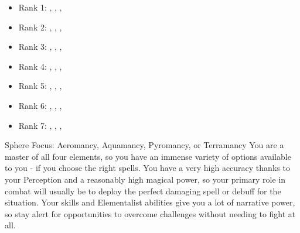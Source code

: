             \begin{itemize}
                \RaggedRight
                \item Rank 1: , , , 
                \item Rank 2: , , , 
                \item Rank 3: , , , 
                \item Rank 4: , , , 
                \item Rank 5: , , , 
                \item Rank 6: , , , 
                \item Rank 7: , , , 
            \end{itemize}
             Sphere Focus: Aeromancy, Aquamancy, Pyromancy, or Terramancy
             You are a master of all four elements, so you have an immense variety of options available to you - if you choose the right spells.
            You have a very high accuracy thanks to your Perception and a reasonably high magical power, so your primary role in combat will usually be to deploy the perfect damaging spell or debuff for the situation.
            Your skills and Elementalist abilities give you a lot of narrative power, so stay alert for opportunities to overcome challenges without needing to fight at all.

